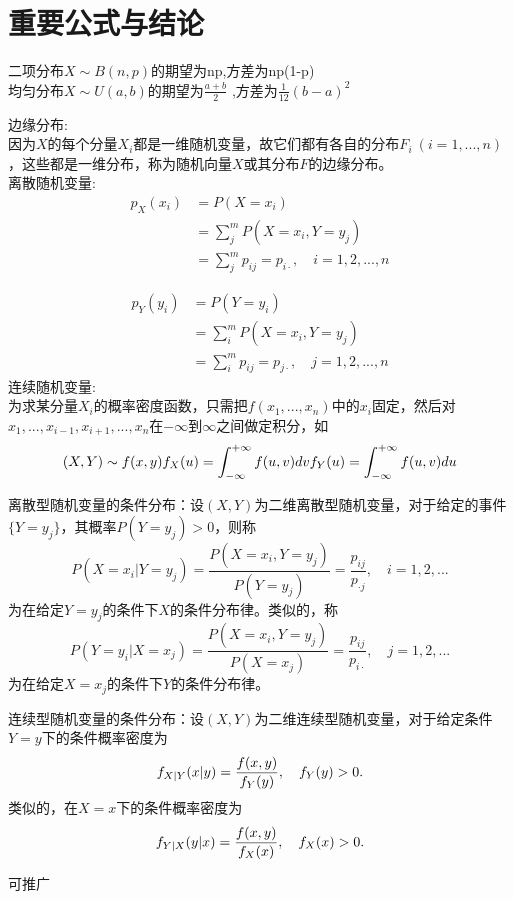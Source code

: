 \section{重要公式与结论}
二项分布$X\sim B(n,p)$的期望为np,方差为np(1-p)\\
均匀分布$X\sim U(a,b)$的期望为$\frac{a+b}{2}$ ,方差为$\frac{1}{12}(b-a)^2$\\
\begin{definition}
  边缘分布:\\
  因为$X$的每个分量$X_i$都是一维随机变量，故它们都有各自的分布$F_i\ (i=1,...,n)$，这些都是一维分布，称为随机向量$X$或其分布$F$的边缘分布。\\
  离散随机变量:\\
  $$
  \begin{aligned}
    p_X(x_i)&=P(X=x_i)\\
    &=\sum_{j}^{m}P(X=x_i,Y=y_j)\\
    &=\sum_{j}^{m}p_{ij}=p_{i\cdot},\quad i=1,2,...,n
  \end{aligned}
  $$

  $$
  \begin{aligned}
    p_Y(y_i)&=P(Y=y_i)\\
    &=\sum_{i}^{m}P(X=x_i,Y=y_j)\\
    &=\sum_{i}^{m}p_{ij}=p_{j\cdot},\quad j=1,2,...,n
  \end{aligned}
  $$
  连续随机变量:\\
  为求某分量$X_i$的概率密度函数，只需把$f(x_1,...,x_n)$中的$x_i$固定，然后对$x_1,...,x_{i-1},x_{i+1},...,x_n$在$-\infty$到$\infty$之间做定积分，如
  $$
  (X,Y)\sim f(x, y)\\
  f_X(u)=\int^{+\infty}_{-\infty}f(u,v)dv\\
  f_Y(u)=\int^{+\infty}_{-\infty}f(u,v)du\\
  $$
\end{definition}

\begin{definition}
  离散型随机变量的条件分布：设$(X,Y)$为二维离散型随机变量，对于给定的事件$\{Y=y_j\}$，其概率$P(Y=y_j)>0$，则称\\
   $$
   P(X=x_i|Y=y_j)=\frac{P(X=x_i,Y=y_j)}{P(Y=y_j)}=\frac{p_{ij}}{p_{\cdot j}},\quad i=1,2,...
   $$
   为在给定$Y=y_j$的条件下$X$的条件分布律。类似的，称
   $$
   P(Y=y_i|X=x_j)=\frac{P(X=x_i,Y=y_j)}{P(X=x_j)}=\frac{p_{ij}}{p_{i\cdot}},\quad j=1,2,...
   $$
   为在给定$X=x_j$的条件下$Y$的条件分布律。

 连续型随机变量的条件分布：设$(X,Y)$为二维连续型随机变量，对于给定条件$Y=y$下的条件概率密度为\\
   $$
   f_{X|Y}(x|y)=\frac{f(x,y)}{f_Y(y)}, \quad f_Y(y)>0.\\
   $$
   类似的，在$X=x$下的条件概率密度为
   $$
   f_{Y|X}(y|x)=\frac{f(x,y)}{f_X(x)}, \quad f_X(x)>0.\\
   $$
\end{definition}
可推广\\


